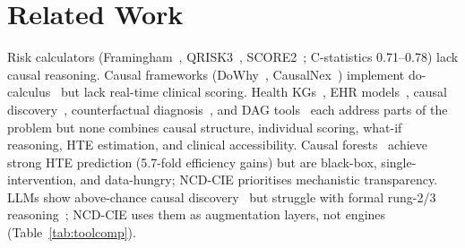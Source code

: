 \documentclass[runningheads]{llncs}
\begin{document}
\section{Related Work}\label{sec:related}

Risk calculators (Framingham~\cite{dagostino2008},
QRISK3~\cite{hippisley2017qrisk3}, SCORE2~\cite{score22021};
C-statistics 0.71--0.78) lack causal reasoning.
Causal frameworks (DoWhy~\cite{sharma2020dowhy},
CausalNex~\cite{beaumont2021causalnex}) implement
do-calculus~\cite{pearl2009causality,hernan2020causal} but lack
real-time clinical scoring.
Health KGs~\cite{chandak2023primekg,barabasi2011network}, EHR
models~\cite{li2020behrt,rasmy2021medbert}, causal
discovery~\cite{prosperi2020causal}, counterfactual
diagnosis~\cite{richens2020causal}, and DAG
tools~\cite{textor2016dagitty} each address parts of the problem
but none combines causal structure, individual scoring, what-if
reasoning, HTE estimation, and clinical accessibility.
Causal forests~\cite{inoue2023causalforest,nakamura2025statin,liu2025china,mori2026sglt2i,lupson2022glycemic}
achieve strong HTE prediction (5.7-fold efficiency gains) but are
black-box, single-intervention, and data-hungry; NCD-CIE
prioritises mechanistic transparency.
LLMs show above-chance causal
discovery~\cite{ma2024causal,kiciman2023causal} but struggle with
formal rung-2/3 reasoning~\cite{jin2023cladder}; NCD-CIE uses them
as augmentation layers, not engines
(Table~\ref{tab:toolcomp}).
\end{document}

